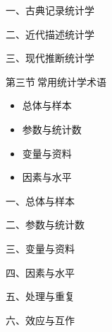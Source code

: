 \documentclass[
  10pt,
  ignorenonframetext,
]{beamer}
\begin{document}
\begin{frame}{一、古典记录统计学}
\protect\hypertarget{ux4e00ux53e4ux5178ux8bb0ux5f55ux7edfux8ba1ux5b66}{}
\end{frame}

\begin{frame}{二、近代描述统计学}
\protect\hypertarget{ux4e8cux8fd1ux4ee3ux63cfux8ff0ux7edfux8ba1ux5b66}{}
\end{frame}

\begin{frame}{三、现代推断统计学}
\protect\hypertarget{ux4e09ux73b0ux4ee3ux63a8ux65adux7edfux8ba1ux5b66}{}
\end{frame}

\begin{frame}{第三节\(~\)常用统计学术语}
\protect\hypertarget{ux7b2cux4e09ux8282ux5e38ux7528ux7edfux8ba1ux5b66ux672fux8bed}{}
\begin{itemize}
\item
  总体与样本
\item
  参数与统计数
\item
  变量与资料
\item
  因素与水平
\end{itemize}
\end{frame}

\begin{frame}{一、总体与样本}
\protect\hypertarget{ux4e00ux603bux4f53ux4e0eux6837ux672c}{}
\end{frame}

\begin{frame}{二、参数与统计数}
\protect\hypertarget{ux4e8cux53c2ux6570ux4e0eux7edfux8ba1ux6570}{}
\end{frame}

\begin{frame}{三、变量与资料}
\protect\hypertarget{ux4e09ux53d8ux91cfux4e0eux8d44ux6599}{}
\end{frame}

\begin{frame}{四、因素与水平}
\protect\hypertarget{ux56dbux56e0ux7d20ux4e0eux6c34ux5e73}{}
\end{frame}

\begin{frame}{五、处理与重复}
\protect\hypertarget{ux4e94ux5904ux7406ux4e0eux91cdux590d}{}
\end{frame}

\begin{frame}{六、效应与互作}
\protect\hypertarget{ux516dux6548ux5e94ux4e0eux4e92ux4f5c}{}
\end{frame}
\end{document}

